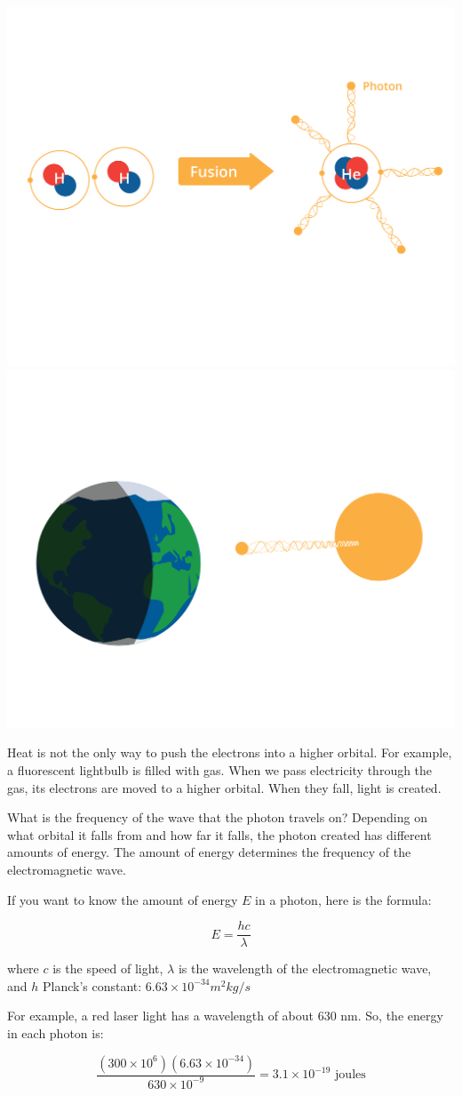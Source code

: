 \includegraphics[width=.5\textwidth]{cow2.png}
\includegraphics[width=.5\textwidth]{cow3.png}



Heat is not the only way to push the electrons into a higher
orbital. For example, a fluorescent lightbulb is filled with gas.
When we pass electricity through the gas, its electrons are moved to a
higher orbital.  When they fall, light is created.



What is the frequency of the wave that the photon travels on?
Depending on what orbital it falls from and how far it falls, the
photon created has different amounts of energy. The amount of energy
determines the frequency of the electromagnetic wave.

\begin{mdframed}[style=important, frametitle={Formula for enegy of a photon}]

If you want to know the amount of energy $E$ in a photon, here is the formula:

$$E = \frac{h c}{\lambda}$$

where $c$ is the speed of light, $\lambda$ is the wavelength of the
electromagnetic wave, and $h$ Planck's constant: $6.63 \times 10^{-34} m^2 kg/s$

For example, a red laser light has a wavelength of about 630 nm. So, the energy in each photon is:

$$\frac{(300 \times 10^6) (6.63 \times 10^{-34})}{630 \times 10^{-9}} = 3.1 \times 10^{-19} \text{ joules}$$

\end{mdframed}

